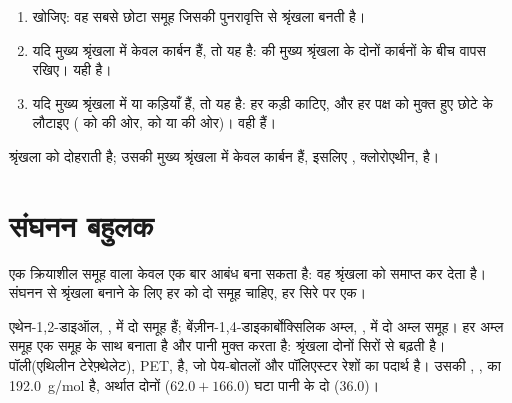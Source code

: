 \begin{method}\label{met:g12:polymers:monomer}
\begin{enumerate}
  \item {} खोजिए: वह सबसे छोटा समूह जिसकी पुनरावृत्ति से
        श्रृंखला बनती है।
  \item यदि मुख्य श्रृंखला में केवल कार्बन  हैं, तो यह  है:  की मुख्य श्रृंखला के दोनों कार्बनों के बीच
         वापस रखिए। यही  है।
  \item यदि मुख्य श्रृंखला में  या  कड़ियाँ हैं, तो यह
         है: हर कड़ी काटिए, और हर पक्ष को
        मुक्त हुए छोटे  के  लौटाइए ( को
         की ओर,  को  या  की ओर)। वही
         हैं।
\end{enumerate}
\end{method}

\begin{example}\label{ex:g12:polymers:pvc}
श्रृंखला   को दोहराती है; उसकी
मुख्य श्रृंखला में केवल कार्बन हैं, इसलिए 
, क्लोरोएथीन, है।
\end{example}

\section{संघनन बहुलक}

एक क्रियाशील समूह वाला  केवल एक बार आबंध बना सकता है: वह श्रृंखला को समाप्त कर देता है।
संघनन से श्रृंखला बनाने के लिए हर  को दो समूह चाहिए, हर
सिरे पर एक।

\begin{example}[PET, एक पॉलिएस्टर]\label{ex:g12:polymers:pet}
एथेन-1,2-डाइऑल, , में दो  समूह हैं;
बेंज़ीन-1,4-डाइकार्बोक्सिलिक अम्ल, , में दो अम्ल समूह। हर
अम्ल समूह एक  समूह के साथ  बनाता है और पानी मुक्त करता है:
श्रृंखला दोनों सिरों से बढ़ती है।  पॉली(एथिलीन टेरेफ़्थेलेट),
PET, है, जो पेय-बोतलों और पॉलिएस्टर रेशों का पदार्थ है। उसकी , , का  \qty{192.0}{g/mol} है, अर्थात
दोनों  ($62.0 + 166.0$) घटा पानी के दो  ($36.0$)।
\end{example}

